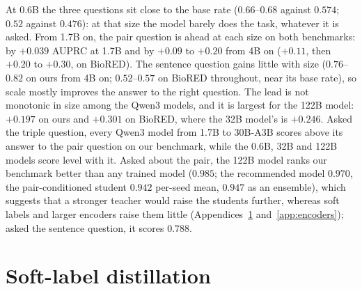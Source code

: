 \documentclass[11pt]{article}
\begin{document}
At 0.6B the three questions sit close to the base rate ($0.66$--$0.68$ against $0.574$; $0.52$
against $0.476$): at that size the model barely does the task, whatever it is asked. From 1.7B on,
the pair question is ahead at each size on both benchmarks: by $+0.039$ AUPRC at 1.7B and by $+0.09$
to $+0.20$ from 4B on ($+0.11$, then $+0.20$ to $+0.30$, on BioRED). The sentence question gains
little with size ($0.76$--$0.82$ on ours from 4B on; $0.52$--$0.57$ on BioRED throughout, near its
base rate), so scale mostly improves the answer to the right question. The lead is not monotonic in
size among the Qwen3 models, and it is largest for the 122B model: $+0.197$ on ours and $+0.301$ on BioRED, where the 32B model's is $+0.246$. Asked the triple question, every Qwen3
model from 1.7B to 30B-A3B scores above its answer to the pair question on our benchmark, while the
0.6B, 32B and 122B models score level with it. Asked about the pair, the 122B model ranks our benchmark better
than any trained model ($0.985$; the recommended model $0.970$, the pair-conditioned student
$0.942$ per-seed mean, $0.947$ as an ensemble), which suggests that a stronger teacher would raise the students further, whereas soft
labels and larger encoders raise them little (Appendices~\ref{app:soft} and~\ref{app:encoders});
asked the sentence question, it scores $0.788$.

\section{Soft-label distillation}
\label{app:soft}
\end{document}
